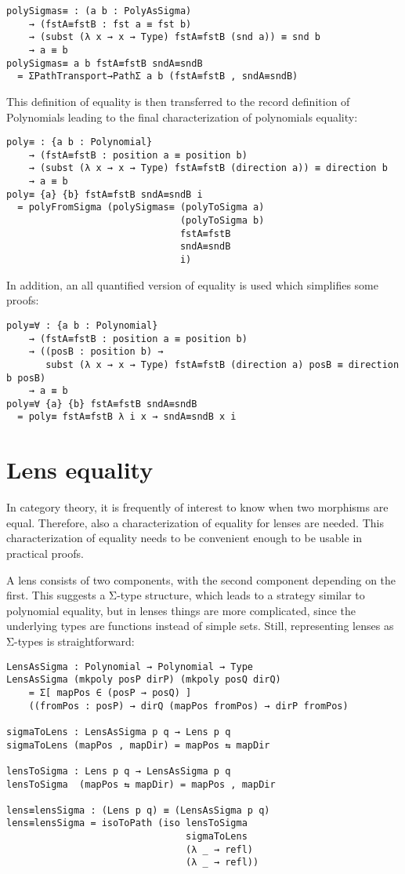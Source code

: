 \begin{verbatim}
polySigmas≡ : (a b : PolyAsSigma)
    → (fstA≡fstB : fst a ≡ fst b)
    → (subst (λ x → x → Type) fstA≡fstB (snd a)) ≡ snd b
    → a ≡ b
polySigmas≡ a b fstA≡fstB sndA≡sndB
  = ΣPathTransport→PathΣ a b (fstA≡fstB , sndA≡sndB)
\end{verbatim}

This definition of equality is then transferred to the record definition of Polynomials leading to the final characterization of polynomials equality:
\begin{verbatim}
poly≡ : {a b : Polynomial}
    → (fstA≡fstB : position a ≡ position b)
    → (subst (λ x → x → Type) fstA≡fstB (direction a)) ≡ direction b
    → a ≡ b
poly≡ {a} {b} fstA≡fstB sndA≡sndB i
  = polyFromSigma (polySigmas≡ (polyToSigma a)
                               (polyToSigma b) 
                               fstA≡fstB 
                               sndA≡sndB 
                               i)
\end{verbatim}

In addition, an all quantified version of equality is used which simplifies some proofs:
\begin{verbatim}
poly≡∀ : {a b : Polynomial}
    → (fstA≡fstB : position a ≡ position b)
    → ((posB : position b) → 
       subst (λ x → x → Type) fstA≡fstB (direction a) posB ≡ direction b posB)
    → a ≡ b
poly≡∀ {a} {b} fstA≡fstB sndA≡sndB
  = poly≡ fstA≡fstB λ i x → sndA≡sndB x i
\end{verbatim}

\section{Lens equality}
In category theory, it is frequently of interest to know when two morphisms are equal. Therefore, also a characterization of equality for lenses are needed. 
This characterization of equality needs to be convenient enough to be usable in practical proofs.

A lens consists of two components, with the second component depending on the first. 
This suggests a Σ-type structure, which leads to a strategy similar to polynomial equality, but in lenses things are more complicated, since the underlying types are functions instead of simple sets.
Still, representing lenses as Σ-types is straightforward:

\begin{verbatim}
LensAsSigma : Polynomial → Polynomial → Type
LensAsSigma (mkpoly posP dirP) (mkpoly posQ dirQ)
    = Σ[ mapPos ∈ (posP → posQ) ]
    ((fromPos : posP) → dirQ (mapPos fromPos) → dirP fromPos)
    
sigmaToLens : LensAsSigma p q → Lens p q
sigmaToLens (mapPos , mapDir) = mapPos ⇆ mapDir

lensToSigma : Lens p q → LensAsSigma p q
lensToSigma  (mapPos ⇆ mapDir) = mapPos , mapDir

lens≡lensSigma : (Lens p q) ≡ (LensAsSigma p q)
lens≡lensSigma = isoToPath (iso lensToSigma
                                sigmaToLens 
                                (λ _ → refl)
                                (λ _ → refl))
\end{verbatim}

